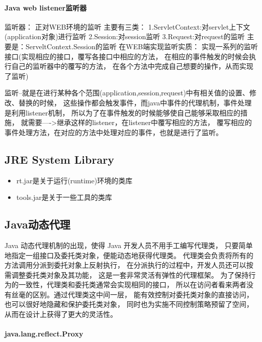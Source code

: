 \documentclass{book}
\begin{document}
\paragraph{Java web listener监听器}
监听器：
    正对WEB环境的监听
    主要有三类：
        1.ServletContext:对servlet上下文(application对象)进行监听
        2.Session:对session监听
        3.Request:对request的监听
主要是：ServeltContext.Session的监听
在WEB端实现监听实质：
实现一系列的监听接口(实现相应的接口，覆写各接口中相应的方法，
在相应的事件触发的时候会执行自己的监听器中的覆写的方法，
在各个方法中完成自己想要的操作，从而实现了监听)

监听--就是在进行某种各个范围(application,session,request)中有相关值的设置、修改、替换的时候，
这些操作都会触发事件，而java中事件的代理机制，事件处理是利用listener机制，
所以为了在事件触发的时候能够使自己能够采取相应的措施，
就需要---->继承这样的listener，在listener中覆写相应的方法，
覆写相应的事件处理方法，在对应的方法中处理对应的事件，也就是进行了监听。

\subsection{JRE System Library}

\begin{itemize}
	\item{rt.jar是关于运行(runtime)环境的类库}
	\item{tools.jar是关于一些工具的类库}
\end{itemize}

\subsection{Java动态代理}

Java 动态代理机制的出现，使得 Java 开发人员不用手工编写代理类，
只要简单地指定一组接口及委托类对象，便能动态地获得代理类。
代理类会负责将所有的方法调用分派到委托对象上反射执行，
在分派执行的过程中，开发人员还可以按需调整委托类对象及其功能，
这是一套非常灵活有弹性的代理框架。
为了保持行为的一致性，代理类和委托类通常会实现相同的接口，
所以在访问者看来两者没有丝毫的区别。通过代理类这中间一层，
能有效控制对委托类对象的直接访问，也可以很好地隐藏和保护委托类对象，
同时也为实施不同控制策略预留了空间，从而在设计上获得了更大的灵活性。

\paragraph{java.lang.reflect.Proxy}
\end{document}
